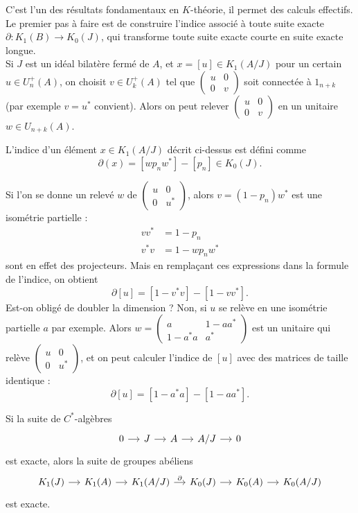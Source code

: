 C'est l'un des résultats fondamentaux en $K$-théorie, il permet des calculs effectifs. Le premier pas à faire est de construire l'indice associé à toute suite exacte $\partial : K_1(B)\rightarrow K_0(J)$, qui transforme toute suite exacte courte en suite exacte longue. \\

Si $J$ est un idéal bilatère fermé de $A$, et $x=[u]\in K_1(A/J)$ pour un certain $u\in U^+_n(A)$, on choisit $v\in U^+_k(A)$ tel que $\begin{pmatrix}u & 0 \\ 0 & v\end{pmatrix}$ soit connectée à $1_{n+k}$ (par exemple $v=u^*$ convient). Alors on peut relever $\begin{pmatrix}u & 0 \\ 0 & v\end{pmatrix}$ en un unitaire $w\in U_{n+k}(A)$.

\begin{definition}
L'indice d'un élément $x\in K_1(A/J)$ décrit ci-dessus est défini comme  
\[\partial (x) = [wp_n w^*]-[p_n]\in K_0(J).\] 
\end{definition}

Si l'on se donne un relevé $w$ de $\begin{pmatrix}u & 0 \\ 0 &u^* \end{pmatrix}$, alors $v=(1-p_n)w^*$ est une isométrie partielle :
\begin{align*}
vv^* &=1-p_n\\
v^*v &=1-w p_n w^*
\end{align*}
sont en effet des projecteurs. Mais en remplaçant ces expressions dans la formule de l'indice, on obtient
\[\partial [u]=[1-v^* v]-[1-vv^*].\]
Est-on obligé de doubler la dimension ? Non, si $u$ se relève en une isométrie partielle $a$ par exemple. Alors $w=\begin{pmatrix}a & 1-aa^* \\ 1-a^*a & a^*\end{pmatrix}$ est un unitaire qui relève $\begin{pmatrix}u & 0 \\ 0 &u^* \end{pmatrix}$, et on peut calculer l'indice de $[u]$ avec des matrices de taille identique : 
\[\partial [u]=[1-a^* a]-[1-aa^*].\]

\begin{prop}
Si la suite de $C^*$-algèbres \[\begin{tikzcd}[column sep = small] 0\arrow{r} & J\arrow{r} & A\arrow{r} & A/J\arrow{r} & 0\end{tikzcd}\]
est exacte, alors la suite de groupes abéliens
\[\begin{tikzcd}[column sep = small] K_1(J) \arrow{r} & K_1(A)\arrow{r} & K_1(A/J) \arrow{r}{\partial} &  K_0(J) \arrow{r} & K_0(A)\arrow{r} & K_0(A/J) \end{tikzcd}\]
est exacte.
\end{prop}

